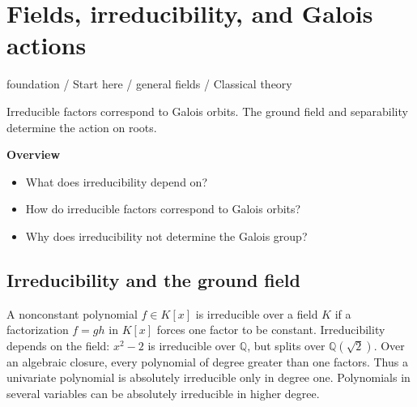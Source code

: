 \documentclass[11pt,a4paper,oneside,openany]{book}
\begin{document}
\chapter{Fields, irreducibility, and Galois actions}\label{article:foundations}\hypertarget{article:foundations}{}\color{black}
{\sffamily\small\color{atlasgold}foundation / Start here / general fields / Classical theory}\par\medskip
Irreducible factors correspond to Galois orbits. The ground field and separability determine the action on roots.\par\medskip
\textbf{Overview}\begin{itemize}
\item What does irreducibility depend on?
\item How do irreducible factors correspond to Galois orbits?
\item Why does irreducibility not determine the Galois group?
\end{itemize}
\section{Irreducibility and the ground field}
\color{black} A nonconstant polynomial \(f\in K[x]\) is irreducible over a field \(K\) if a factorization \(f=gh\) in \(K[x]\) forces one factor to be constant. Irreducibility depends on the field: \(x^2-2\) is irreducible over \(\mathbb Q\), but splits over \(\mathbb Q(\sqrt2)\). Over an algebraic closure, every polynomial of degree greater than one factors. Thus a univariate polynomial is absolutely irreducible only in degree one. Polynomials in several variables can be absolutely irreducible in higher degree.\par
\end{document}
